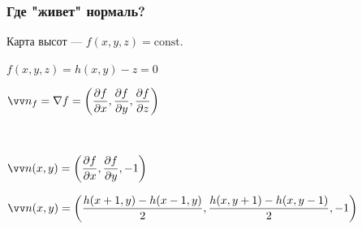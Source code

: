 \documentclass[10pt]{beamer}
\begin{document}
\begin{frame}\frametitle {Где "живет" нормаль?}
	
	{
	}{
		Карта высот --- $f(x,y,z)=\mathrm{const}$.
		
		$f(x,y,z) = h(x,y) -z=0$
		
		$\vv n_f = \nabla f = \left( \dfrac{\partial f}{\partial x},\dfrac{\partial f}{\partial y},\dfrac{\partial f}{\partial z} \right)$
		
		
		
		~
		
		$\vv n(x,y) = \left( \dfrac{\partial f}{\partial x},\dfrac{\partial f}{\partial y},-1 \right)$
	}
	$\vv n(x,y) = \left(\dfrac{h(x+1,y)-h(x-1,y) }{2},\dfrac{h(x,y+1)-h(x,y-1) }{2}, -1  \right) $
\end{frame}
	
\end{document}
